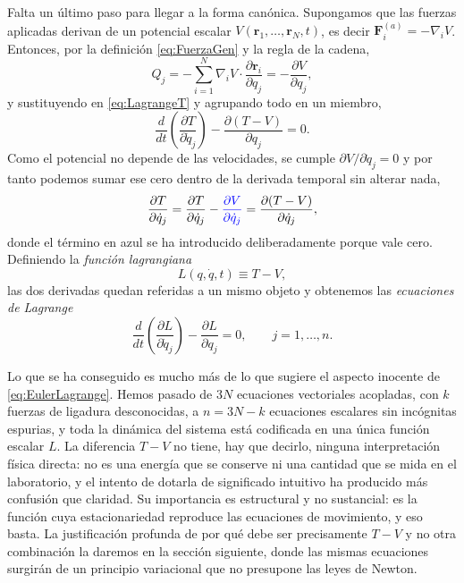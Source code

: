         Falta un último paso para llegar a la forma canónica. Supongamos que las fuerzas aplicadas derivan de un potencial escalar $V(\mathbf{r}_{1},\ldots,\mathbf{r}_{N},t)$, es decir $\mathbf{F}_{i}^{(a)} = -\nabla_{i}V$. Entonces, por la definición \eqref{eq:FuerzaGen} y la regla de la cadena,
        \begin{equation}\label{eq:FuerzaGenPotencial}
            Q_{j} = -\sum_{i=1}^{N}\nabla_{i}V\cdot\frac{\partial\mathbf{r}_{i}}{\partial q_{j}} = -\frac{\partial V}{\partial q_{j}},
        \end{equation}
        y sustituyendo en \eqref{eq:LagrangeT} y agrupando todo en un miembro,
        \begin{equation}\label{eq:LagrangePaso}
            \frac{d}{dt}\left(\frac{\partial T}{\partial\dot{q}_{j}}\right) - \frac{\partial (T-V)}{\partial q_{j}} = 0 .
        \end{equation}
        Como el potencial no depende de las velocidades, se cumple $\partial V/\partial\dot{q}_{j} = 0$ y por tanto podemos sumar ese cero dentro de la derivada temporal sin alterar nada,
        \begin{equation}\label{eq:SumaCero}
            \frac{\partial T}{\partial\dot{q}_{j}} = \frac{\partial T}{\partial\dot{q}_{j}} - \textcolor{blue}{\frac{\partial V}{\partial\dot{q}_{j}}} = \frac{\partial(T-V)}{\partial\dot{q}_{j}},
        \end{equation}
        donde el término en azul se ha introducido deliberadamente porque vale cero. Definiendo la \textit{función lagrangiana}
        \begin{equation}\label{eq:Lagrangiano}
            L(q,\dot{q},t) \equiv T - V,
        \end{equation}
        las dos derivadas quedan referidas a un mismo objeto y obtenemos las \textit{ecuaciones de Lagrange}
        \begin{equation}\label{eq:EulerLagrange}
            \boxed{\;\frac{d}{dt}\left(\frac{\partial L}{\partial\dot{q}_{j}}\right) - \frac{\partial L}{\partial q_{j}} = 0, \qquad j = 1,\ldots,n .\;}
        \end{equation}

        Lo que se ha conseguido es mucho más de lo que sugiere el aspecto inocente de \eqref{eq:EulerLagrange}. Hemos pasado de $3N$ ecuaciones vectoriales acopladas, con $k$ fuerzas de ligadura desconocidas, a $n = 3N-k$ ecuaciones escalares sin incógnitas espurias, y toda la dinámica del sistema está codificada en una única función escalar $L$. La diferencia $T-V$ no tiene, hay que decirlo, ninguna interpretación física directa: no es una energía que se conserve ni una cantidad que se mida en el laboratorio, y el intento de dotarla de significado intuitivo ha producido más confusión que claridad. Su importancia es estructural y no sustancial: es la función cuya estacionariedad reproduce las ecuaciones de movimiento, y eso basta. La justificación profunda de por qué debe ser precisamente $T-V$ y no otra combinación la daremos en la sección siguiente, donde las mismas ecuaciones surgirán de un principio variacional que no presupone las leyes de Newton.

